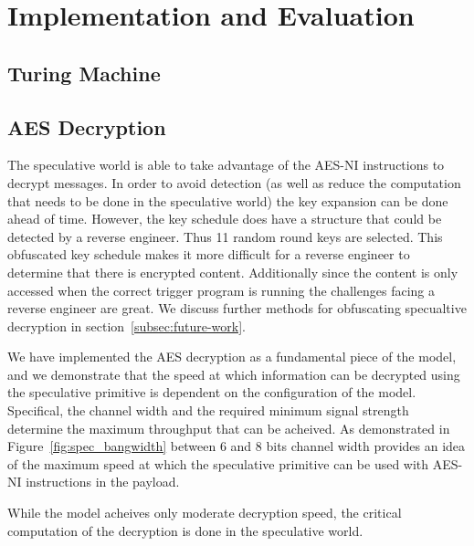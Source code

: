 
\section{Implementation and Evaluation}

\subsection{Turing Machine}



\subsection{AES Decryption}
The speculative world is able to take advantage of the AES-NI instructions to
decrypt messages. In order to avoid detection (as well as reduce the computation
that needs to be done in the speculative world) the key expansion can be done
ahead of time. However, the key schedule does have a structure that could be
detected by a reverse engineer. Thus 11 random round keys are selected. This
obfuscated key schedule makes it more difficult for a reverse engineer to
determine that there is encrypted content. Additionally since the content is
only accessed when the correct trigger program is running the challenges facing
a reverse engineer are great. We discuss further methods for obfuscating specualtive
decryption in section~\ref{subsec:future-work}. 


We have implemented the AES decryption as a fundamental piece of the \speculake model,
and we demonstrate that the speed at which information can be decrypted using the speculative 
primitive is dependent on the configuration of the \speculake model. Specifical,
the channel width and the required minimum signal strength determine the maximum
throughput that can be acheived. As demonstrated in Figure~\ref{fig:spec_bangwidth} 
between 6 and 8 bits channel width provides an idea of the maximum speed at which the 
speculative primitive can be used with AES-NI instructions in the payload. 

While the \speculake model acheives only moderate decryption speed, the 
critical computation of the decryption is done in the speculative world. 

